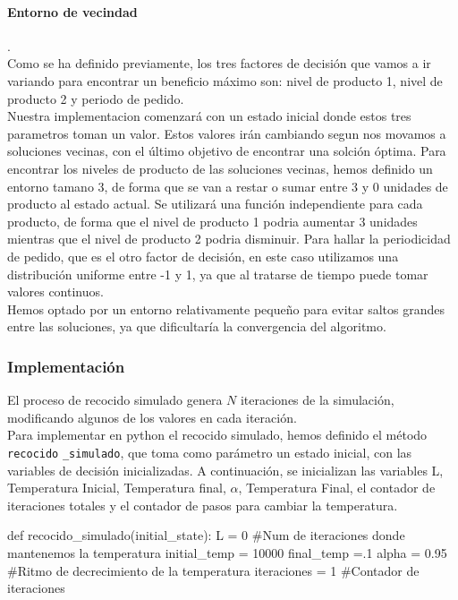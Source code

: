 \documentclass[a4paper,12pt]{article}
\begin{document}
	\paragraph{Entorno de vecindad}.\\	
	
	
	Como se ha definido previamente, los tres factores de decisión que vamos a ir variando para encontrar un beneficio máximo son: nivel de producto 1, nivel de producto 2 y periodo de pedido. \\
	Nuestra implementacion comenzará con un estado inicial donde estos tres parametros toman un valor. Estos valores irán cambiando segun nos movamos a soluciones vecinas, con el último objetivo de 
	encontrar una solción óptima. 
	Para encontrar los niveles de producto de las soluciones vecinas, hemos definido un entorno tamano 3, de forma que se van a restar o sumar entre 3 y 0 unidades de producto al estado actual. Se utilizará una función 
	independiente para cada producto, de forma que el nivel de producto 1 podria aumentar 3 unidades mientras que el nivel de producto 2 podria disminuir. 
	Para hallar la periodicidad de pedido, que es el otro factor de decisión, en este caso utilizamos una distribución uniforme entre -1 y 1, ya que al tratarse de tiempo puede tomar valores continuos. \\
	Hemos optado por un entorno relativamente pequeño para evitar saltos grandes entre las soluciones, ya que dificultaría la convergencia del algoritmo. 
	
	\subsubsection{Implementación}
	El proceso de recocido simulado genera $N$ iteraciones de la simulación, modificando algunos de los valores en cada iteración.\\
	
	Para implementar en python el recocido simulado, hemos definido el método \texttt{recocido} \texttt{\_simulado}, que toma como parámetro un estado inicial, con las variables de  	decisión inicializadas. A continuación, se inicializan las variables L, Temperatura Inicial, Temperatura final, $\alpha$, Temperatura Final, el contador de iteraciones totales y el contador de pasos para cambiar la temperatura. 

	\begin{python}
def recocido_simulado(initial_state):
	L = 0 #Num de iteraciones donde mantenemos la temperatura
	initial_temp = 10000 
	final_temp =.1
	alpha = 0.95 #Ritmo de decrecimiento de la temperatura
	iteraciones = 1 #Contador de iteraciones
	\end{python}
\end{document}
